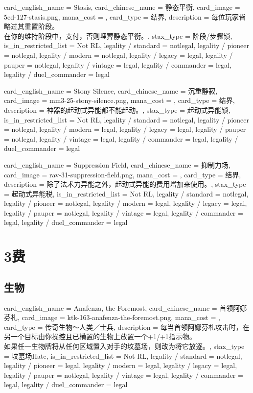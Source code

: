 \documentclass[lang = cn, color = black, 10pt]{AllThatStax}
\begin{document}
\card
{
	card_english_name = {Stasis},
	card_chinese_name = {静态平衡},
	card_image = 5ed-127-stasis.png,
	mana_cost = ,
	card_type = 结界,
	description = {每位玩家皆略过其重置阶段。\\
在你的维持阶段中，支付，否则埋葬静态平衡。},
	stax_type = 阶段/步骤锁,
	is_in_restricted_list = Not RL,
	legality / standard = notlegal,
	legality / pioneer = notlegal,
	legality / modern = notlegal,
	legality / legacy = legal,
	legality / pauper = notlegal,
	legality / vintage = legal,
	legality / commander = legal,
	legality / duel_commander = legal
}

\card
{
	card_english_name = {Stony Silence},
	card_chinese_name = {沉重静寂},
	card_image = mm3-25-stony-silence.png,
	mana_cost = ,
	card_type = 结界,
	description = {神器的起动式异能都不能起动。},
	stax_type = 起动式异能锁,
	is_in_restricted_list = Not RL,
	legality / standard = notlegal,
	legality / pioneer = notlegal,
	legality / modern = legal,
	legality / legacy = legal,
	legality / pauper = notlegal,
	legality / vintage = legal,
	legality / commander = legal,
	legality / duel_commander = legal
}

\card
{
	card_english_name = {Suppression Field},
	card_chinese_name = {抑制力场},
	card_image = rav-31-suppression-field.png,
	mana_cost = ,
	card_type = 结界,
	description = {除了法术力异能之外，起动式异能的费用增加来使用。},
	stax_type = 起动式异能税,
	is_in_restricted_list = Not RL,
	legality / standard = notlegal,
	legality / pioneer = notlegal,
	legality / modern = legal,
	legality / legacy = legal,
	legality / pauper = notlegal,
	legality / vintage = legal,
	legality / commander = legal,
	legality / duel_commander = legal
}

\chapter{3费}

\section{生物}

\card
{
	card_english_name = {Anafenza, the Foremost},
	card_chinese_name = {首领阿娜芬札},
	card_image = ktk-163-anafenza-the-foremost.png,
	mana_cost = ,
	card_type = 传奇生物～人类／士兵,
	description = {每当首领阿娜芬札攻击时，在另一个目标由你操控且已横置的生物上放置一个+1/+1指示物。\\
如果任一生物牌将从任何区域置入对手的坟墓场，则改为将它放逐。},
	stax_type = 坟墓场Hate,
	is_in_restricted_list = Not RL,
	legality / standard = notlegal,
	legality / pioneer = legal,
	legality / modern = legal,
	legality / legacy = legal,
	legality / pauper = notlegal,
	legality / vintage = legal,
	legality / commander = legal,
	legality / duel_commander = legal
}
\end{document}
